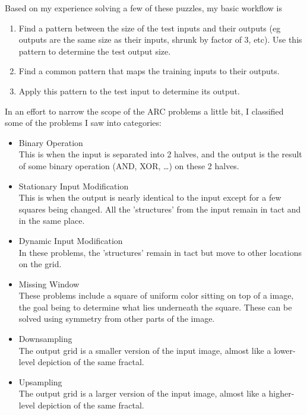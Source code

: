 \documentclass[letterpaper]{article} %
\begin{document}
Based on my experience solving a few of these puzzles, my basic workflow is
\begin{enumerate}
    \item Find a pattern between the size of the test inputs and their outputs (eg outputs are the same size as their inputs, shrunk by factor of 3, etc). Use this pattern to determine the test output size.
    \item Find a common pattern that maps the training inputs to their outputs.
    \item Apply this pattern to the test input to determine its output.
\end{enumerate}

\bigskip

In an effort to narrow the scope of the ARC problems a little bit, I classified some of the problems I saw into categories:


\begin{itemize}
    \item Binary Operation\\
    This is when the input is separated into 2 halves, and the output is the result of some binary operation (AND, XOR, \ldots) on these 2 halves. \\
    \item Stationary Input Modification\\
    This is when the output is nearly identical to the input except for a few squares being changed. All the 'structures' from the input remain in tact and in the same place.\\
    \item Dynamic Input Modification\\
    In these problems, the 'structures' remain in tact but move to other locations on the grid.\\
    \item Missing Window\\
    These problems include a square of uniform color sitting on top of a image, the goal being to determine what lies underneath the square. These can be solved using symmetry from other parts of the image.\\
    \item Downsampling\\
    The output grid is a smaller version of the input image, almost like a lower-level depiction of the same fractal.\\
    \item Upsampling \\
    The output grid is a larger version of the input image, almost like a higher-level depiction of the same fractal.\\
\end{itemize}
\end{document}
